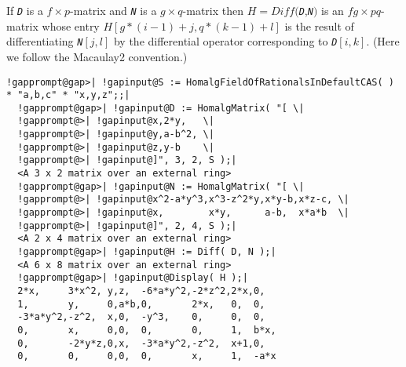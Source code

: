 \documentclass[a4paper,11pt]{report}
\begin{document}
{{{ If \mbox{\texttt{\mdseries\slshape D}} is a $f \times p$-matrix and \mbox{\texttt{\mdseries\slshape N}} is a $g \times q$-matrix then $H=Diff($\mbox{\texttt{\mdseries\slshape D}},\mbox{\texttt{\mdseries\slshape N}}$)$ is an $fg \times pq$-matrix whose entry $H[g*(i-1)+j,q*(k-1)+l]$ is the result of differentiating \mbox{\texttt{\mdseries\slshape N}}$[j,l]$ by the differential operator corresponding to \mbox{\texttt{\mdseries\slshape D}}$[i,k]$. (Here we follow the Macaulay2 convention.) 
\begin{Verbatim}[commandchars=!@|,fontsize=\small,frame=single,label=Example]
  !gapprompt@gap>| !gapinput@S := HomalgFieldOfRationalsInDefaultCAS( ) * "a,b,c" * "x,y,z";;|
  !gapprompt@gap>| !gapinput@D := HomalgMatrix( "[ \|
  !gapprompt@>| !gapinput@x,2*y,   \|
  !gapprompt@>| !gapinput@y,a-b^2, \|
  !gapprompt@>| !gapinput@z,y-b    \|
  !gapprompt@>| !gapinput@]", 3, 2, S );|
  <A 3 x 2 matrix over an external ring>
  !gapprompt@gap>| !gapinput@N := HomalgMatrix( "[ \|
  !gapprompt@>| !gapinput@x^2-a*y^3,x^3-z^2*y,x*y-b,x*z-c, \|
  !gapprompt@>| !gapinput@x,        x*y,      a-b,  x*a*b  \|
  !gapprompt@>| !gapinput@]", 2, 4, S );|
  <A 2 x 4 matrix over an external ring>
  !gapprompt@gap>| !gapinput@H := Diff( D, N );|
  <A 6 x 8 matrix over an external ring>
  !gapprompt@gap>| !gapinput@Display( H );|
  2*x,     3*x^2, y,z,  -6*a*y^2,-2*z^2,2*x,0,  
  1,       y,     0,a*b,0,       2*x,   0,  0,  
  -3*a*y^2,-z^2,  x,0,  -y^3,    0,     0,  0,  
  0,       x,     0,0,  0,       0,     1,  b*x,
  0,       -2*y*z,0,x,  -3*a*y^2,-z^2,  x+1,0,  
  0,       0,     0,0,  0,       x,     1,  -a*x
\end{Verbatim}
 }

 }

  }
\end{document}
